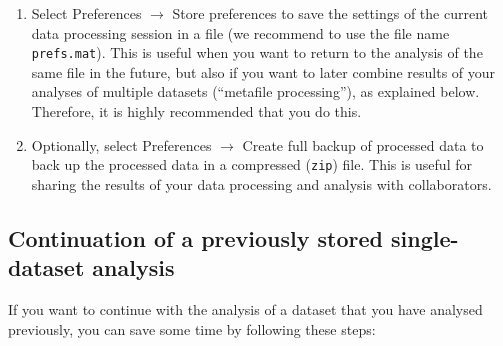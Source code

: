 \documentclass[a4paper, 11pt]{article}
\newcommand{\ttt}[1]{\texttt{#1}}
\newcommand{\lans}[1]{{\color{magenta}#1}}
\newcommand\ra{\rightarrow}
\newcommand\addon[1]{-- {\small #1}}
\newcounter{step}
\begin{document}
\begin{enumerate}
\item Select \lans{Preferences} $\ra$ \lans{Store preferences} to save the settings of the current data processing session in a file (we recommend to use the file name \ttt{prefs.mat}). This is useful when you want to return to the analysis of the same file in the future, but also if you want to later combine results of your analyses of multiple datasets (``metafile processing''), as explained below. Therefore, it is highly recommended that you do this.



\item Optionally, select \lans{Preferences} $\ra$ \lans{Create full backup of processed data} to back up the processed data in a compressed (\ttt{zip}) file. This is useful for sharing the results of your data processing and analysis with collaborators.

\end{enumerate}


\subsection{Continuation of a previously stored single-dataset analysis}

If you want to continue with the analysis of a dataset that you have analysed previously, you can save some time by following these steps:
\end{document}
